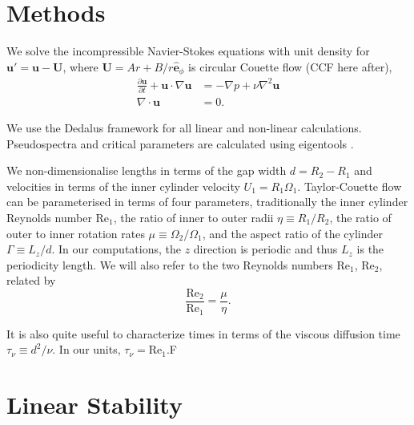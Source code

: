 \documentclass[openacc]{rstransa}%
\newcommand{\Reyn}{\mathrm{Re}}
\begin{document}
\section{Methods}
\label{sec:methods}
We solve the incompressible Navier-Stokes equations with unit density for $\mathbf{u}' = \mathbf{u} - \mathbf{U}$,
where $\mathbf{U} = A r + B/r \hat{\mathbf{e}}_\phi$ is circular Couette flow (CCF here after),
\begin{align}
      \frac{\partial \mathbf{u}}{\partial t} + \mathbf{u} \cdot \nabla \mathbf{u} &= -\nabla p + \nu \nabla^2\mathbf{u}\\
      \nabla \cdot \mathbf{u} &= 0.
\end{align}

We use the Dedalus framework \cite{2020PhRvR...2b3068B} for all linear and non-linear calculations. Pseudospectra and critical parameters are calculated using eigentools \cite{2021JOSS....6.3079O}. 

We non-dimensionalise lengths in terms of the gap width $d = R_2 - R_1$ and velocities in terms of the inner cylinder velocity $U_1 = R_1 \Omega_1$. Taylor-Couette flow can be parameterised in terms of four parameters, traditionally the inner cylinder Reynolds number $\Reyn_1$, the ratio of inner to outer radii $\eta \equiv R_1/R_2$, the ratio of outer to inner rotation rates $\mu \equiv \Omega_2/\Omega_1$, and the aspect ratio of the cylinder $\Gamma \equiv L_z/d$. In our computations, the $z$ direction is periodic and thus $L_z$ is the periodicity length. We will also refer to the two Reynolds numbers $\Reyn_1$, $\Reyn_2$, related by
\begin{equation}
    \frac{\Reyn_2}{\Reyn_1} = \frac{\mu}{\eta}.
\end{equation}

It is also quite useful to characterize times in terms of the viscous diffusion time $\tau_\nu \equiv d^2/\nu$. In our units, $\tau_\nu = \Reyn_1$.F
\section{Linear Stability}
\label{sec:linear}
\end{document}
